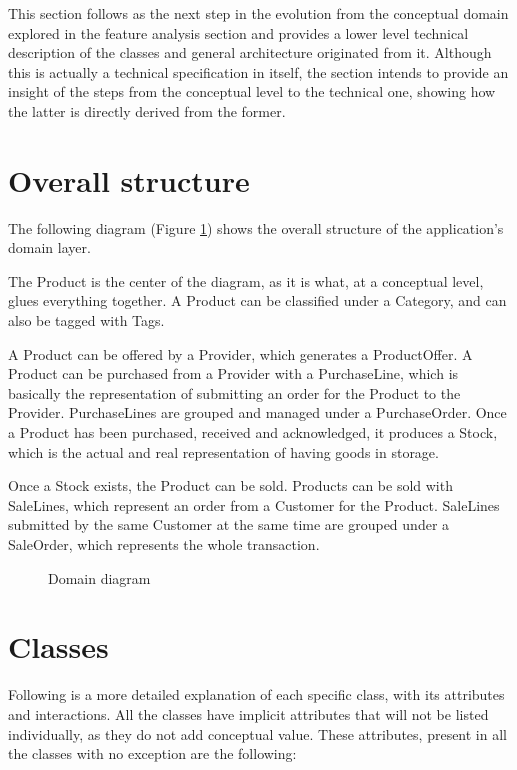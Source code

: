This section follows as the next step in the evolution from the conceptual domain explored in the feature analysis section and provides a lower level technical description of the classes and general architecture originated from it. Although this is actually a technical specification in itself, the section intends to provide an insight of the steps from the conceptual level to the technical one, showing how the latter is directly derived from the former.

\section{Overall structure}
The following diagram (Figure \ref{fig:smappclasses}) shows the overall structure of the application’s domain layer.

The Product is the center of the diagram, as it is what, at a conceptual level, glues everything together. A Product can be classified under a Category, and can also be tagged with Tags.

A Product can be offered by a Provider, which generates a ProductOffer. A Product can be purchased from a Provider with a PurchaseLine, which is basically the representation of submitting an order for the Product to the Provider. PurchaseLines are grouped and managed under a PurchaseOrder. Once a Product has been purchased, received and acknowledged, it produces a Stock, which is the actual and real representation of having goods in storage.

Once a Stock exists, the Product can be sold. Products can be sold with SaleLines, which represent an order from a Customer for the Product. SaleLines submitted by the same Customer at the same time are grouped under a SaleOrder, which represents the whole transaction.

\begin{figure}
	\centering
	\caption{Domain diagram}
	\label{fig:smappclasses}
\end{figure}

\section{Classes}
Following is a more detailed explanation of each specific class, with its attributes and interactions. All the classes have implicit attributes that will not be listed individually, as they do not add conceptual value. These attributes, present in all the classes with no exception are the following:

